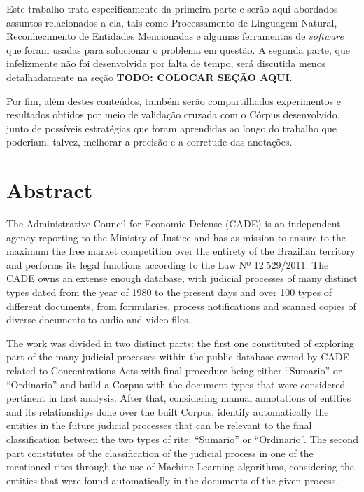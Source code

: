 \documentclass[11pt]{article}
\newcommand{\quotes}[1]{``#1''}
\begin{document}
Este trabalho trata especificamente da primeira parte e serão aqui abordados assuntos relacionados a ela, tais como Processamento de Linguagem Natural, Reconhecimento de Entidades
Mencionadas e algumas ferramentas de \textit{software} que foram usadas para solucionar o problema em questão. A segunda parte, que infelizmente não foi desenvolvida por falta de tempo,
será discutida menos detalhadamente na seção \textbf{TODO: COLOCAR SEÇÃO AQUI}.

Por fim, além destes conteúdos, também serão compartilhados experimentos e resultados obtidos por meio de validação cruzada com o Córpus desenvolvido, junto de possíveis estratégias que
foram aprendidas ao longo do trabalho que poderiam, talvez, melhorar a precisão e a corretude das anotações.

\pagebreak
\thispagestyle{empty}
\section*{Abstract}

\indent\indent The Administrative Council for Economic Defense (CADE) is an independent agency reporting to the Ministry of Justice and has as mission to ensure to the maximum the free
market competition over the entirety of the Brazilian territory and performs its legal functions according to the Law Nº 12.529/2011. The CADE owns an extense enough database, with
judicial processes of many distinct types dated from the year of 1980 to the present days and over 100 types of different documents, from formularies, process notifications and scanned
copies of diverse documents to audio and video files.

The work was divided in two distinct parts: the first one constituted of exploring part of the many judicial processes within the public database owned by CADE related to Concentrations
Acts with final procedure being either \quotes{Sumario} or \quotes{Ordinario} and build a Corpus with the document types that were considered pertinent in first analysis. After that,
considering manual annotations of entities and its relationships done over the built Corpus, identify automatically the entities in the future judicial processes that can be relevant to the
final classification between the two types of rite: \quotes{Sumario} or \quotes{Ordinario}. The second part constitutes of the classification of the judicial process in one of the
mentioned rites through the use of Machine Learning algorithms, considering the entities that were found automatically in the documents of the given process.
\end{document}
